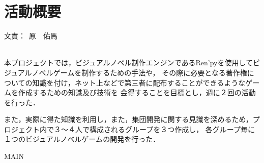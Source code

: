 \documentclass[a4paper]{jarticle}
\newcommand{\resp}[1]{\begin{flushright}文責：~#1\end{flushright}~\\}
\begin{document}
\fi

\section{活動概要}
  \resp{原　佑馬}

  本プロジェクトでは，ビジュアルノベル制作エンジンであるRen'pyを使用してビジュアルノベルゲームを制作するための手法や，
  その際に必要となる著作権についての知識を付け，ネット上などで第三者に配布することができるようなゲームを作成するための知識及び技術を
  会得することを目標とし，週に２回の活動を行った．

  また，実際に得た知識を利用し，また，集団開発に関する見識を深めるため，プロジェクト内で３〜４人で構成されるグループを３つ作成し，
  各グループ毎に１つのビジュアルノベルゲームの開発を行った．

\expandafter\ifx\csname MAIN\endcsname\relax
  
\end{document}
